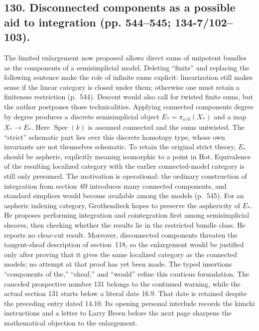 \documentclass[10pt,oneside]{book}
\begin{document}
\subsection*{130. Disconnected components as a possible aid to integration (pp. 544--545; 134-7/102--103).}
The limited enlargement now proposed allows direct sums of unipotent bundles as the components of a semisimplicial model. Deleting ``finite'' and replacing the following sentence make the role of infinite sums explicit: linearization still makes sense if the linear category is closed under them; otherwise one must retain a finiteness restriction (p.~544). Descent would also call for twisted finite sums, but the author postpones those technicalities. Applying connected components degree by degree produces a discrete semisimplicial object $E_* = \pi_{o/k}(X_*)$ and a map $X_*\to E_*$. Here $\operatorname{Spec}(k)$ is assumed connected and the sums untwisted. The ``strict'' schematic part lies over this discrete homotopy type, whose own invariants are not themselves schematic. To retain the original strict theory, $E_*$ should be aspheric, explicitly meaning isomorphic to a point in $\mathrm{Hot}$. Equivalence of the resulting localized category with the earlier connected-model category is still only presumed. The motivation is operational: the ordinary construction of integration from section~69 introduces many connected components, and standard simplices would become available among the models (p.~545). For an aspheric indexing category, Grothendieck hopes to preserve the asphericity of $E_*$. He proposes performing integration and cointegration first among semisimplicial sheaves, then checking whether the results lie in the restricted bundle class. He reports no clear-cut result. Moreover, disconnected components threaten the tangent-sheaf description of section~118, so the enlargement would be justified only after proving that it gives the same localized category as the connected models; no attempt at that proof has yet been made. The typed insertions ``components of the,'' ``sheaf,'' and ``would'' refine this cautious formulation. The canceled prospective number 131 belongs to the continued warning, while the actual section 131 starts below a literal date 16.9. That date is retained despite the preceding entry dated 14.10. Its opening personal interlude records the kimchi instructions and a letter to Larry Breen before the next page sharpens the mathematical objection to the enlargement.
\end{document}
